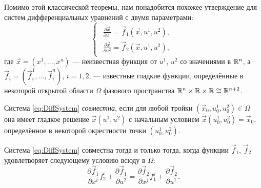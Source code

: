 Помимо этой классической теоремы, нам понадобится похожее утверждение для систем дифференциальных уравнений с двумя параметрами: 
\begin{equation} \label{eq:DiffSystem}
	\begin{cases}
		\begin{aligned}
			\frac{\partial\vec{x}}{\partial u^1} = \vec{f}_1(\vec{x}, u^1, u^2),\\
			\frac{\partial\vec{x}}{\partial u^2} = \vec{f}_2(\vec{x}, u^1, u^2),
		\end{aligned}
	\end{cases}
\end{equation}
где $\vec{x} = (x^1, \ldots, x^n)$ --- неизвестная функция от $u^1$, $u^2$ со значениями в $\mathbb{R}^n$, а $\vec{f}_i = (\vec{f}_i^1, \ldots, \vec{f}_i^n)$, $i = 1, 2$, --- известные гладкие функции, определённые в некоторой открытой области $\Omega$ фазового пространства $\mathbb{R}^n \times \mathbb{R} \times \mathbb{R} \cong \mathbb{R}^{n + 2}$.

\begin{definition}
	Система \eqref{eq:DiffSystem} \textit{совместна}, если для любой тройки $(\vec{x}_0, u^1_0, u^2_0) \in \Omega$ она имеет гладкое решение $\vec{x}(u^1, u^2)$ с начальным условием $\vec{x}(u^1_0, u^2_0) = \vec{x}_0$, определённое в некоторой окрестности точки $(u^1_0, u^2_0)$.
\end{definition}

\begin{theorem}[Дарбу] \label{theorem:Darboux}
	Система \eqref{eq:DiffSystem} совместна тогда и только тогда, когда функции $\vec{f}_1$, $\vec{f}_2$ удовлетворяет следующему условию всюду в $\Omega$:
	\begin{equation} \label{eq:Darboux}
		\frac{\partial \vec{f}_1}{\partial x^i}f^i_2 + \frac{\partial\vec{f}_1}{\partial u^2} = \frac{\partial\vec{f}_2}{\partial x^j}f^j_1 + \frac{\partial\vec{f}_2}{\partial u^1}.
	\end{equation}
\end{theorem}

